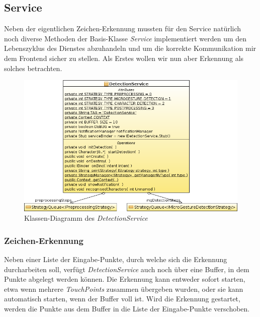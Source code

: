 \subsection{Service}\label{lbl_be_impl_service}

Neben der eigentlichen Zeichen-Erkennung mussten für den Service natürlich noch diverse Methoden der Basis-Klasse \emph{Service} implementiert werden um den Lebenszyklus des Dienstes abzuhandeln und um die korrekte Kommunikation mir dem Frontend sicher zu stellen. Als Erstes wollen wir nun aber Erkennung als solches betrachten.

\begin{figure}[h!]
   \centering
   \includegraphics[width=\textwidth]{img/uml_cd_detectionservice} 
   \caption{Klassen-Diagramm des \emph{DetectionService}}
   \label{fig:cd_detectionservice}
\end{figure}

\subsubsection{Zeichen-Erkennung}

Neben einer Liste der Eingabe-Punkte, durch welche sich die Erkennung durcharbeiten soll, verfügt \emph{DetectionService} auch noch über eine Buffer, in dem Punkte abgelegt werden können. Die Erkennung kann entweder sofort starten, etwa wenn mehrere \emph{TouchPoints} zusammen übergeben wurden, oder sie kann automatisch starten, wenn der Buffer voll ist. Wird die Erkennung gestartet, werden die Punkte aus dem Buffer in die Liste der Eingabe-Punkte verschoben.

